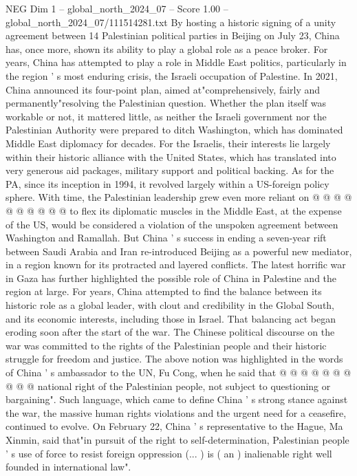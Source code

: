 \begin{textsample}{NEG Dim 1 – global\_north\_2024\_07 – Score 1.00 – global\_north\_2024\_07/111514281.txt}  \label{ex:f1_neg_061}
By hosting a historic signing of a unity agreement between 14 Palestinian political parties in Beijing on July 23, China has, once more, shown its ability to play a global role as a peace broker.
For years, China has attempted to play a role in Middle East politics, particularly in the region ' s most enduring crisis, the Israeli occupation of Palestine.
In 2021, China announced its four-point plan, aimed at"comprehensively, fairly and permanently"resolving the Palestinian question.
Whether the plan itself was workable or not, it mattered little, as neither the Israeli government nor the Palestinian Authority were prepared to ditch Washington, which has dominated Middle East diplomacy for decades.
For the Israelis, their interests lie largely within their historic alliance with the United States, which has translated into very generous aid packages, military support and political backing.
As for the PA, since its inception in 1994, it revolved largely within a US-foreign policy sphere.
With time, the Palestinian leadership grew even more reliant on @ @ @ @ @ @ @ @ @ @ to flex its diplomatic muscles in the Middle East, at the expense of the US, would be considered a violation of the unspoken agreement between Washington and Ramallah.
But China ' s success in ending a seven-year rift between Saudi Arabia and Iran re-introduced Beijing as a powerful new mediator, in a region known for its protracted and layered conflicts.
The latest horrific war in Gaza has further highlighted the possible role of China in Palestine and the region at large.
For years, China attempted to find the balance between its historic role as a global leader, with clout and credibility in the Global South, and its economic interests, including those in Israel.
That balancing act began eroding soon after the start of the war.
The Chinese political discourse on the war was committed to the rights of the Palestinian people and their historic struggle for freedom and justice.
The above notion was highlighted in the words of China ' s ambassador to the UN, Fu Cong, when he said that @ @ @ @ @ @ @ @ @ @ national right of the Palestinian people, not subject to questioning or bargaining".
Such language, which came to define China ' s strong stance against the war, the massive human rights violations and the urgent need for a ceasefire, continued to evolve.
On February 22, China ' s representative to the Hague, Ma Xinmin, said that"in pursuit of the right to self-determination, Palestinian people ' s use of force to resist foreign oppression (... ) is ( an ) inalienable right well founded in international law".

\end{textsample}
